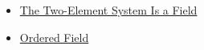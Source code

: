 \begin{dependencies}
\begin{itemize}
  \item \hyperref[thm:two-element-system-is-field]{The Two-Element System Is a Field}
  \item \hyperref[def:abstract-ordered-field]{Ordered Field}
\end{itemize}
\end{dependencies}
